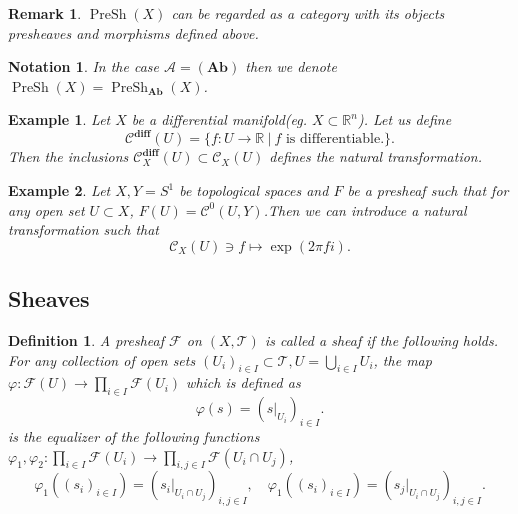 \documentclass{article}
\newtheorem{definition}{Definition}[section]
\newtheorem{notation}{Notation}[section]
\newtheorem{remark}{Remark}[section]
\newtheorem{example}{Example}[section]
\numberwithin{equation}{section}
\DeclareMathOperator{\PreSh}{PreSh}
\begin{document}
\begin{remark}
$\PreSh(X)$ can be regarded as a category with its objects presheaves and morphisms defined above. 
\end{remark}

\begin{notation}
In the case $\mathcal{A}= (\mathbf{Ab})$ then we denote $\PreSh(X)=\PreSh_{\mathbf{Ab}}(X)$.
\end{notation}

\begin{example}
Let $X$ be a differential manifold(eg. $X\subset\mathbb{R}^n$). Let us define 
\begin{equation*}
\mathcal{C}^{\mathbf{diff}}(U) = \{f:U\to\mathbb{R}\:|\:f\text{ is differentiable.}\}. 
\end{equation*}
Then the inclusions $\mathcal{C}_X^{\mathbf{diff}}(U)\subset\mathcal{C}_X(U)$ defines the natural transformation.
\end{example}

\begin{example}
Let $X,Y=S^1$ be topological spaces and $F$ be a presheaf such that for any open set $U\subset X$, $F(U)=\mathcal{C}^0(U,Y)$.Then we can introduce a natural transformation such that 
\begin{equation*}
\mathcal{C}_X(U)\ni f\mapsto \exp(2\pi fi).
\end{equation*}
\end{example}

\subsection{Sheaves}

\begin{definition}
A presheaf $\mathcal{F}$ on $(X,\mathcal{T})$ is called a sheaf if the following holds.
For any collection of open sets $(U_i)_{i\in I}\subset \mathcal{T},U=\bigcup_{i\in I}U_i$, the map $\varphi:\mathcal{F}(U)\to\prod_{i\in I}\mathcal{F}(U_i)$ which is defined as
\begin{equation*}
\varphi(s) = (s|_{U_i})_{i\in I}.
\end{equation*}
is the equalizer of the following functions $\varphi_1,\varphi_2:\prod_{i\in I}\mathcal{F}(U_i)\to\prod_{i,j\in I}\mathcal{F}(U_i\cap U_j)$, 
\begin{equation*}
\varphi_1((s_i)_{i\in I}) = (s_i|_{U_i\cap U_j})_{i,j\in I},\quad\varphi_1((s_i)_{i\in I}) = (s_j|_{U_i\cap U_j})_{i,j\in I}.
\end{equation*}
\end{definition}
\end{document}
